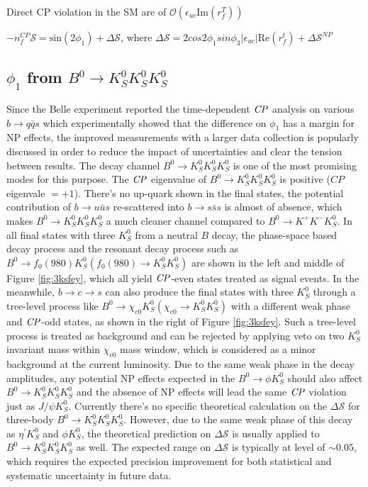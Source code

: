 \textbullet \space Direct CP violation in the SM are of $\mathcal{O}(\epsilon_{uc}\text{Im}(r^T_f))$


\textbullet \space $-n^{CP}_f\mathcal{S} = \text{sin}(2\phi_1) + \Delta \mathcal{S}$, where
$\Delta \mathcal{S}=2{cos}2\phi_1 {sin}\phi_3 |\epsilon_{uc}| \text{Re}(r^t_f) + \Delta \mathcal{S}^{NP}$


\subsection{$\phi_1$ from $B^0 \to K_S^0  K_S^0  K_S^0$}%
Since the Belle experiment reported the time-dependent $\it{CP}$ analysis on various $b\to q\bar{q}s$ which experimentally showed that the difference on $\phi_1$ has a margin for NP effects\cite{chen2007observation}, the improved measurements with a larger data collection is popularly discussed in order to reduce the impact of uncertainties and clear the tension between results. The decay channel $B^0 \to K_S^0  K_S^0  K_S^0$ is one of the most promising modes for this purpose. The $\it{CP}$ eigenvalue of $B^0 \to K_S^0  K_S^0  K_S^0$ is positive ($CP$ eigenvale $=+1$).  There's no up-quark shown in the final states, the potential contribution of $b\to u\bar{u}s$ re-scattered into $b\to s\bar{s}s$ is almost of absence, which makes $B^0 \to K_S^0  K_S^0  K_S^0$ a much cleaner channel compared to $B^0 \to K^+  K^-  K_S^0$\cite{gershon2004time}. In all final states with three $K_S^0$ from a neutral $B$ decay, the phase-space based decay process and the resonant decay process such as $B^0\to f_0(980)K_S^0(f_0(980)\to K_S^0 K_S^0)$ are shown in the left and middle of Figure \ref{fig:3ksfey}, which all yield $\it{CP}$-even states treated as signal events. In the meanwhile, $b\to c \to s$ can also produce the final states with three $K_S^0$ through a tree-level process like $B^0\to \chi_{c0}K_S^0(\chi_{c0}\to K_S^0 K_S^0)$ with a different weak phase and $\it{CP}$-odd states, as shown in the right of Figure \ref{fig:3ksfey}. Such a tree-level process is treated as background and can be rejected by applying veto on two $K_S^0$ invariant mass within $\chi_{c0}$ mass window, which is considered as a minor background at the current luminosity. Due to the same weak phase in the decay amplitudes, any potential NP effects expected in the $B^0 \to \phi K^0_S$ should also affect $B^0 \to K_S^0  K_S^0  K_S^0$ and the absence of NP effects will lead the same $\it{CP}$ violation just  as $J/\psi K^0_S$\cite{gershon2004time}. Currently there's no specific theoretical calculation on the $\Delta \mathcal{S}$ for three-body $B^0 \to K_S^0  K_S^0  K_S^0$. However, due to the same weak phase of this decay as $\eta^{'} K^0_S$ and $\phi K^0_S$, the theoretical prediction on $\Delta \mathcal{S}$ is usually applied to $B^0 \to K_S^0  K_S^0  K_S^0$ as well\cite{gershon2004time}. The expected range on $\Delta \mathcal{S}$ is typically at level of  $\sim 0.05$\cite{beneke2005corrections}, which requires the expected precision improvement for both statistical and systematic uncertainty in future data.


